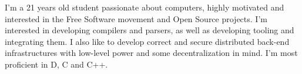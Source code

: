 

\begin{cvparagraph}

I'm a 21 years old student passionate about computers, highly motivated and
	interested in the Free Software movement and Open Source projects. I'm
	interested in developing compilers and parsers, as well as developing
	tooling and integrating them. I also like to develop correct and secure
	distributed back-end infrastructures with low-level power and some
	decentralization in mind. I'm most proficient in D, C and C++.

\end{cvparagraph}
